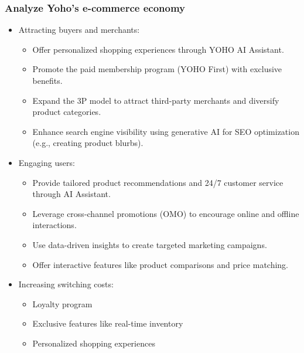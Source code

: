 \subsubsection{Analyze Yoho’s e-commerce economy}
\begin{itemize}
    \item Attracting buyers and merchants:
          \begin{itemize}
              \item Offer personalized shopping experiences through YOHO AI Assistant.
              \item Promote the paid membership program (YOHO First) with exclusive benefits.
              \item Expand the 3P model to attract third-party merchants and diversify product categories.
              \item Enhance search engine visibility using generative AI for SEO optimization (e.g., creating product blurbs).
          \end{itemize}
    \item Engaging users:
          \begin{itemize}
              \item Provide tailored product recommendations and 24/7 customer service through AI Assistant.
              \item Leverage cross-channel promotions (OMO) to encourage online and offline interactions.
              \item Use data-driven insights to create targeted marketing campaigns.
              \item Offer interactive features like product comparisons and price matching.
          \end{itemize}
    \item Increasing switching costs:
          \begin{itemize}
              \item Loyalty program
              \item Exclusive features like real-time inventory
              \item Personalized shopping experiences
          \end{itemize}
\end{itemize}

